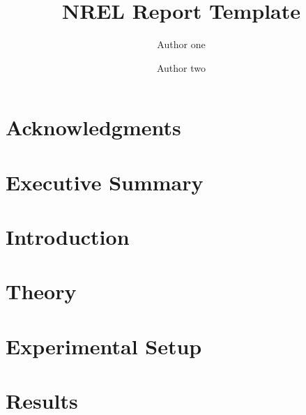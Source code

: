 \documentclass[]{nrel}
\title{NREL Report Template}
\author{Author one} %
\author{Author two} %
\affil{National Renewable Energy Laboratory}
\begin{document}
\frontmatter
\chapter{Acknowledgments}


\chapter{Executive Summary}

\clearpage
\tableofcontents
\listoffigures
\listoftables

\mainmatter
\pagestyle{fancy}
\chapter{Introduction} %
\label{sec:intro}



\chapter{Theory}
\label{sec:theory}

\chapter{Experimental Setup}
\label{sec:exp}

\chapter{Results}
\label{sec:results}
\end{document}
